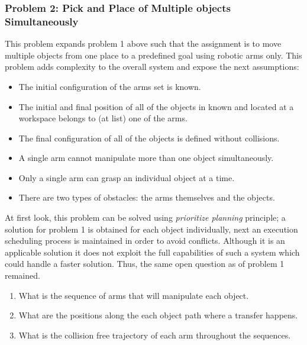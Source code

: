 \subsubsection*{Problem 2: Pick and Place of Multiple objects Simultaneously }
This problem expands problem 1 above such that the assignment is to move multiple objects from one place to a predefined goal using robotic arms only. This problem adds complexity to the overall system and expose the next assumptions:
\begin{itemize}
\item The initial configuration of the arms set is known.
\item The initial and final position of all of the objects in known and located at a workspace belongs to (at list) one of the arms.
\item The final configuration of all of the objects is defined without collisions.
\item A single arm cannot manipulate more than one object simultaneously.
\item Only a single arm can grasp an individual object at a time. 
\item There are two types of obstacles: the arms themselves and the objects.
\end{itemize}


At first look, this problem can be solved using \textit{prioritize planning} principle; a solution for problem 1 is obtained for each object individually, next an execution scheduling process is maintained in order to avoid conflicts. Although it is an applicable solution it does not exploit the full capabilities of such a system which could handle a faster solution. Thus, the same open question as of problem 1 remained.

\begin{enumerate}
\item What is the sequence of arms that will manipulate each object.
\item What are the positions along the each object path where a transfer happens.
\item  What is the collision free trajectory of each arm throughout the sequences.
\end{enumerate}
  
